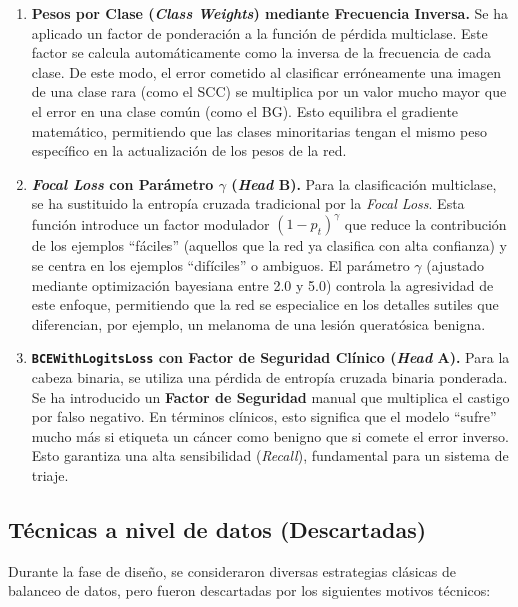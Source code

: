 \begin{enumerate}
	\item \textbf{Pesos por Clase (\textit{Class Weights}) mediante Frecuencia Inversa.} Se ha aplicado un factor de ponderación a la función de pérdida multiclase. Este factor se calcula automáticamente como la inversa de la frecuencia de cada clase. De este modo, el error cometido al clasificar erróneamente una imagen de una clase rara (como el SCC) se multiplica por un valor mucho mayor que el error en una clase común (como el BG). Esto equilibra el gradiente matemático, permitiendo que las clases minoritarias tengan el mismo peso específico en la actualización de los pesos de la red.
	
	\item \textbf{\textit{Focal Loss} con Parámetro $\gamma$ (\textit{Head} B).} Para la clasificación multiclase, se ha sustituido la entropía cruzada tradicional por la \textit{Focal Loss}. Esta función introduce un factor modulador $(1 - p_t)^\gamma$ que reduce la contribución de los ejemplos ``fáciles'' (aquellos que la red ya clasifica con alta confianza) y se centra en los ejemplos ``difíciles'' o ambiguos. El parámetro $\gamma$ (ajustado mediante optimización bayesiana entre 2.0 y 5.0) controla la agresividad de este enfoque, permitiendo que la red se especialice en los detalles sutiles que diferencian, por ejemplo, un melanoma de una lesión queratósica benigna.
	
	\item \textbf{\texttt{BCEWithLogitsLoss} con Factor de Seguridad Clínico (\textit{Head} A).} Para la cabeza binaria, se utiliza una pérdida de entropía cruzada binaria ponderada. Se ha introducido un \textbf{Factor de Seguridad} manual que multiplica el castigo por falso negativo. En términos clínicos, esto significa que el modelo ``sufre'' mucho más si etiqueta un cáncer como benigno que si comete el error inverso. Esto garantiza una alta sensibilidad (\textit{Recall}), fundamental para un sistema de triaje.
\end{enumerate}

\subsection{Técnicas a nivel de datos (Descartadas)}

Durante la fase de diseño, se consideraron diversas estrategias clásicas de balanceo de datos, pero fueron descartadas por los siguientes motivos técnicos:

